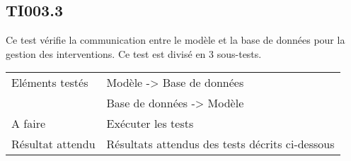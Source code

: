
\subsection{TI003.3}
\label{TI003.3}
  		Ce test vérifie la communication entre le modèle et la base de données pour la gestion des interventions. Ce test est divisé en 3 sous-tests.
  	
 
 	 \begin{center}
    	 	\begin{tabular}[h]{|p{}|p{}|}
		\hline
			Eléments testés & Modèle -> Base de données  \\
						    &  Base de données -> Modèle \\\hline
    			A faire & Exécuter les tests \nameref{TI003.3.1} \nameref{TI003.3.2} \nameref{TI003.3.3} \\\hline
    			Résultat attendu & Résultats attendus des tests décrits ci-dessous \\\hline
     	\end{tabular}
  	\end{center}	
  	

  		




  		
  		

